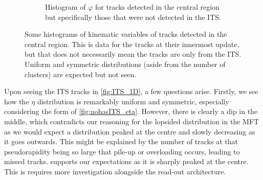 \begin{figure}[h]
\begin{subfigure}[t]{.49\linewidth}
        \caption{Histogram of $\varphi$ for tracks detected in the central region but specifically those that were not detected in the ITS.}
        \label{fig:nohasITS_phi_no_ITS}
    \end{subfigure}
\caption[Histograms of $\eta$, $\varphi$, and ITS inner barrel  for tracks in the central region]{Some histograms of kinematic variables of tracks detected in the central region. This is data for the tracks at their innermost update, but that does not necessarily mean the tracks are only from the ITS. Uniform and symmetric distributions (aside from the number of clusters) are expected but not seen.}
\label{fig:ITS_1D_nohasITS}
\end{figure}

Upon seeing the ITS tracks in \cref{fig:ITS_1D}, a few questions arise. Firstly, we see how the $\eta$ distribution is remarkably uniform and symmetric, especially considering the form of \cref{fig:nohasITS_eta}. However, there is clearly a dip in the middle, which contradicts our reasoning for the lopsided distribution in the MFT as we would expect a distribution peaked at the centre and slowly decreasing as it goes outwards. This might be explained by the number of tracks at that pseudorapidity being so large that pile-up or overloading occurs, leading to missed tracks.  supports our expectations as it is sharply peaked at the centre. This is requires more investigation alongside the read-out architecture.

